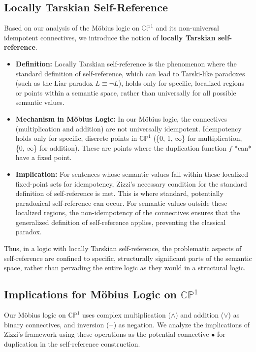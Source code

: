 	\subsection{Locally Tarskian Self-Reference}
	
	Based on our analysis of the M\"{o}bius logic on \(\mathbb{CP}^1\) and its non-universal idempotent connectives, we introduce the notion of \textbf{locally Tarskian self-reference}.
	
	\begin{itemize}
		\item \textbf{Definition:} Locally Tarskian self-reference is the phenomenon where the standard definition of self-reference, which can lead to Tarski-like paradoxes (such as the Liar paradox \(L \equiv \neg L\)), holds only for specific, localized regions or points within a semantic space, rather than universally for all possible semantic values.
		\item \textbf{Mechanism in Möbius Logic:} In our M\"{o}bius logic, the connectives (multiplication and addition) are not universally idempotent. Idempotency holds only for specific, discrete points in \(\mathbb{CP}^1\) (\{0, 1, \(\infty\)\} for multiplication, \{0, \(\infty\)\} for addition). These are points where the duplication function \(f\) *can* have a fixed point.
		\item \textbf{Implication:} For sentences whose semantic values fall within these localized fixed-point sets for idempotency, Zizzi's necessary condition for the standard definition of self-reference is met. This is where standard, potentially paradoxical self-reference can occur. For semantic values outside these localized regions, the non-idempotency of the connectives ensures that the generalized definition of self-reference applies, preventing the classical paradox.
	\end{itemize}
	Thus, in a logic with locally Tarskian self-reference, the problematic aspects of self-reference are confined to specific, structurally significant parts of the semantic space, rather than pervading the entire logic as they would in a structural logic.
	
	\subsection{Implications for Möbius Logic on \(\mathbb{CP}^1\)}
	
	Our M\"{o}bius logic on \(\mathbb{CP}^1\) uses complex multiplication (\(\wedge\)) and addition (\(\vee\)) as binary connectives, and inversion (\(\neg\)) as negation. We analyze the implications of Zizzi's framework using these operations as the potential connective \(\bullet\) for duplication in the self-reference construction.
	
